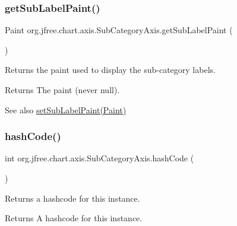 \subsubsection{\texorpdfstring{get\+Sub\+Label\+Paint()}{getSubLabelPaint()}}
{\footnotesize\ttfamily Paint org.\+jfree.\+chart.\+axis.\+Sub\+Category\+Axis.\+get\+Sub\+Label\+Paint (\begin{DoxyParamCaption}{ }\end{DoxyParamCaption})}

Returns the paint used to display the sub-\/category labels.

\begin{DoxyReturn}{Returns}
The paint (never {\ttfamily null}).
\end{DoxyReturn}
\begin{DoxySeeAlso}{See also}
\mbox{\hyperlink{classorg_1_1jfree_1_1chart_1_1axis_1_1_sub_category_axis_a92b94ccece53829f092607e7331cd7ef}{set\+Sub\+Label\+Paint(\+Paint)}} 
\end{DoxySeeAlso}
\mbox{\label{classorg_1_1jfree_1_1chart_1_1axis_1_1_sub_category_axis_a48bbe35f7bea704a62ccc37d14f2133e}} 
\subsubsection{\texorpdfstring{hash\+Code()}{hashCode()}}
{\footnotesize\ttfamily int org.\+jfree.\+chart.\+axis.\+Sub\+Category\+Axis.\+hash\+Code (\begin{DoxyParamCaption}{ }\end{DoxyParamCaption})}

Returns a hashcode for this instance.

\begin{DoxyReturn}{Returns}
A hashcode for this instance. 
\end{DoxyReturn}
\mbox{\label{classorg_1_1jfree_1_1chart_1_1axis_1_1_sub_category_axis_aa5dffd9ba5e9aa087a9cf9ef801433fc}} 
